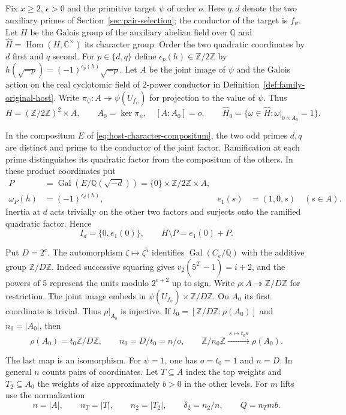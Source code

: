\begin{definition}\label{def:translate-scale}
Fix \(x\ge2\), \(\epsilon>0\) and the primitive target \(\psi\) of
order \(o\). Here \(q,d\) denote the two auxiliary primes of
Section~\ref{sec:pair-selection}; the conductor of the target is \(f_\psi\).
Let \(H\) be the Galois group of the auxiliary abelian field over \(\mathbb Q\)
and \(\widehat H=\operatorname{Hom}(H,\mathbb C^\times)\) its character group.
Order the two quadratic coordinates by \(d\) first and \(q\) second.
For \(p\in\{d,q\}\) define \(\epsilon_p(h)\in\mathbb Z/2\mathbb Z\) by
\(h(\sqrt{-p})=(-1)^{\epsilon_p(h)}\sqrt{-p}\).
Let \(A\) be the joint image of \(\psi\) and the Galois action on the real
cyclotomic field of \(2\)-power conductor in Definition~\ref{def:family-original-host}.
Write \(\pi_\psi:A\twoheadrightarrow\psi(U_{f_\psi})\) for projection to the value of \(\psi\). Thus
\[
 H=(\mathbb Z/2\mathbb Z)^2\times A,\qquad
 A_0=\ker\pi_\psi,\quad [A:A_0]=o,\qquad
 \widehat H_0=\{\omega\in\widehat H:\omega|_{0\times A_0}=1\}.
\]

In the compositum \(E\) of \eqref{eq:host-character-compositum}, the two
odd primes \(d,q\) are distinct and prime to the conductor of the joint
factor. Ramification at each prime distinguishes its quadratic factor
from the compositum of the others. In these product coordinates put
\[
 \begin{aligned}
 P&=\operatorname{Gal}(E/\mathbb Q(\sqrt{-d}))
       =\{0\}\times\mathbb Z/2\mathbb Z\times A,\\
 \omega_P(h)&=(-1)^{\epsilon_d(h)},&
 e_1(s)&=(1,0,s)\quad(s\in A).
 \end{aligned}
\]
Inertia at \(d\) acts trivially on the other two factors and surjects
onto the ramified quadratic factor. Hence
\[
 I_d=\{0,e_1(0)\},\qquad H\setminus P=e_1(0)+P.
\]

Put \(D=2^e\). The automorphism \(\zeta\mapsto\zeta^5\) identifies
\(\operatorname{Gal}(C_e/\mathbb Q)\) with the additive group
\(\mathbb Z/D\mathbb Z\). Indeed successive squaring gives
\(v_2(5^{2^i}-1)=i+2\), and the powers of 5 represent the units
modulo \(2^{e+2}\) up to sign. Write \(\rho:A\twoheadrightarrow
\mathbb Z/D\mathbb Z\) for restriction. The joint image embeds in
\(\psi(U_{f_\psi})\times\mathbb Z/D\mathbb Z\). On \(A_0\) its first
coordinate is trivial. Thus \(\rho|_{A_0}\) is injective. If
\(t_0=[\mathbb Z/D\mathbb Z:\rho(A_0)]\) and \(n_0=|A_0|\), then
\begin{equation}\label{eq:dyadic-coordinate-orders}
 \rho(A_0)=t_0\mathbb Z/D\mathbb Z,\qquad
 n_0=D/t_0=n/o,\qquad
 \mathbb Z/n_0\mathbb Z\xrightarrow{\ s\mapsto t_0s\ }\rho(A_0).
\end{equation}

The last map is an isomorphism. For \(\psi=1\), one has \(o=t_0=1\)
and \(n=D\). In general \(n\) counts pairs of coordinates.
Let \(T\subseteq A\) index the top weights and \(T_2\subseteq A_0\)
the weights of size approximately \(b>0\) in the other levels.
For \(m\) lifts use the normalization
\[
 n=|A|,\qquad n_T=|T|,\qquad n_2=|T_2|,\qquad
 \delta_2=n_2/n,\qquad Q=n_Tmb.
\]
\end{definition}

